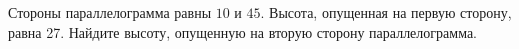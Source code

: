 \begin{ex}
	\begin{condition}
		Стороны параллелограмма равны \( 10 \) и \( 45 \). Высота, опущенная на первую сторону, равна 27. Найдите высоту, опущенную на вторую сторону параллелограмма.
	\end{condition}
\end{ex}